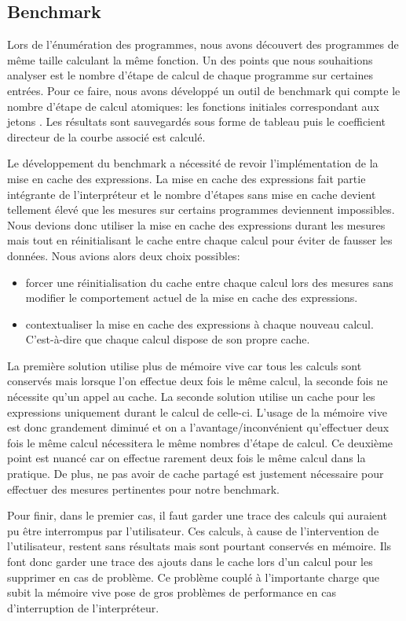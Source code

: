\documentclass[a4paper, 11pt]{article}
\begin{document}
\subsection{Benchmark}

Lors de l'énumération des programmes, nous avons découvert des programmes de même taille calculant
la même fonction. Un des points que nous souhaitions analyser est le nombre d'étape de calcul
de chaque programme sur certaines entrées. Pour ce faire, nous avons développé un outil de benchmark
qui compte le nombre d'étape de calcul atomiques: les fonctions initiales correspondant aux jetons
. Les résultats sont
sauvegardés sous forme de tableau puis le coefficient directeur de la courbe associé est calculé.

Le développement du benchmark a nécessité de revoir l'implémentation de la mise en cache des expressions.
La mise en cache des expressions fait partie intégrante de l'interpréteur et le nombre d'étapes
sans mise en cache devient tellement élevé que les mesures sur certains programmes deviennent impossibles.
Nous devions donc utiliser la mise en cache des expressions durant les mesures mais tout en réinitialisant
le cache entre chaque calcul pour éviter de fausser les données. Nous avions alors deux choix possibles:
\begin{itemize}
    \item forcer une réinitialisation du cache entre chaque calcul lors des mesures sans modifier le
    comportement actuel de la mise en cache des expressions.
    \item contextualiser la mise en cache des expressions à chaque nouveau calcul. C'est-à-dire que 
    chaque calcul dispose de son propre cache.
\end{itemize}

La première solution utilise plus de mémoire vive car tous les calculs sont conservés mais lorsque l'on effectue
deux fois le même calcul, la seconde fois ne nécessite qu'un appel au cache.
La seconde solution utilise un cache pour les expressions uniquement durant le calcul de celle-ci.
L'usage de la mémoire vive est donc grandement diminué et on a l'avantage/inconvénient qu'effectuer
deux fois le même calcul nécessitera le même nombres d'étape de calcul. Ce deuxième point est nuancé car
on effectue rarement deux fois le même calcul dans la pratique. De plus, ne pas avoir de cache partagé
est justement nécessaire pour effectuer des mesures pertinentes pour notre benchmark.

Pour finir, dans le premier
cas, il faut garder une trace des calculs qui auraient pu être interrompus par l'utilisateur. Ces calculs,
à cause de l'intervention de l'utilisateur, restent sans résultats mais sont pourtant conservés en mémoire.
Ils font donc garder une trace des ajouts dans le cache lors d'un calcul pour les supprimer en cas de problème.
Ce problème couplé à l'importante charge que subit la mémoire vive pose de gros problèmes de performance en
cas d'interruption de l'interpréteur.
\end{document}
